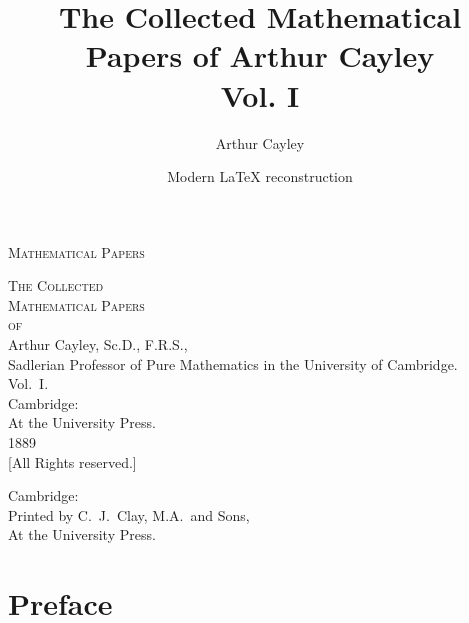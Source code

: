 \documentclass[11pt,a4paper]{book}
\title{The Collected Mathematical Papers of Arthur Cayley\\Vol. I}
\author{Arthur Cayley}
\date{Modern \LaTeX{} reconstruction}
\begin{document}
\maketitle


\frontmatter

\thispagestyle{empty}
\begin{center}
\vspace*{2in}
{\Large\scshape Mathematical Papers}
\end{center}
\cleardoublepage

\thispagestyle{empty}
\begin{center}
\vspace*{1.5in}
{\Huge\scshape The Collected\\[0.3em] Mathematical Papers}\\[1.5em]
{\Large\scshape of}\\[1.5em]
{\LARGE Arthur Cayley, Sc.D., F.R.S.,}\\[0.5em]
{\small Sadlerian Professor of Pure Mathematics in the University of Cambridge.}\\[2em]
{\Large Vol.\ I.}\\[2em]
\vfill
{\large Cambridge:}\\
{\normalsize At the University Press.}\\[0.5em]
{\small 1889}\\[0.5em]
{\scriptsize [All Rights reserved.]}
\end{center}
\cleardoublepage

\thispagestyle{empty}
\begin{center}
\vspace*{3in}
{\small Cambridge:}\\
{\small Printed by C.\ J.\ Clay, M.A.\ and Sons,}\\
{\small At the University Press.}
\end{center}
\cleardoublepage

\chapter*{Preface}
\end{document}

